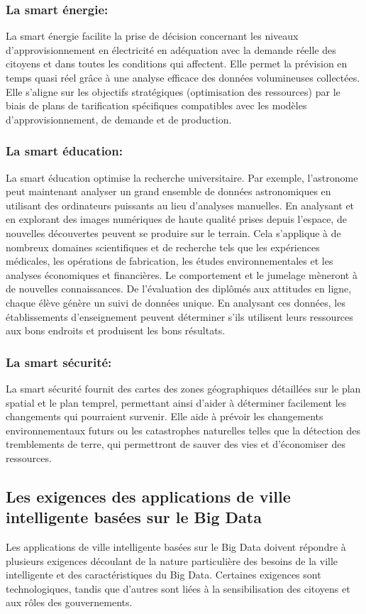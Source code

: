 \documentclass[french, a4paper, 12pt]{report}
\begin{document}
\subsubsection{La smart énergie:}
La smart énergie facilite la prise de décision concernant les niveaux d'approvisionnement en électricité en adéquation avec la demande réelle des citoyens et dans toutes les conditions qui affectent.
Elle permet la prévision en temps quasi réel grâce à une analyse efficace des données volumineuses collectées.
Elle s’aligne sur les objectifs stratégiques (optimisation des ressources) par le biais de plans de tarification spécifiques compatibles avec les modèles d'approvisionnement, de demande et de production.\\
\subsubsection{La smart éducation:}
La smart éducation optimise la recherche universitaire. Par exemple, l'astronome peut maintenant analyser un grand ensemble de données astronomiques en utilisant des ordinateurs puissants au lieu d'analyses manuelles. En analysant et en explorant des images numériques de haute qualité prises depuis l'espace, de nouvelles découvertes peuvent se produire sur le terrain. Cela s'applique à de nombreux domaines scientifiques et de recherche tels que les expériences médicales, les opérations de fabrication, les études environnementales et les analyses économiques et financières.
Le comportement et le jumelage mèneront à de nouvelles connaissances. De l'évaluation des diplômés aux attitudes en ligne, chaque élève génère un suivi de données unique. En analysant ces données, les établissements d’enseignement peuvent déterminer s’ils utilisent leurs ressources aux bons endroits et produisent les bons résultats.\\
\subsubsection{La smart sécurité:}
La smart sécurité fournit des cartes des zones géographiques détaillées sur le plan spatial et le plan temprel, permettant ainsi d’aider à déterminer facilement les changements qui pourraient survenir.
Elle aide à prévoir les changements environnementaux futurs ou les catastrophes naturelles telles que la détection des tremblements de terre, qui permettront de sauver des vies et d'économiser des ressources.\\

\subsection{Les exigences des applications de ville intelligente basées sur le Big Data}
Les applications de ville intelligente basées sur le Big Data doivent répondre à plusieurs exigences découlant de la nature particulière des besoins de la ville intelligente et des caractéristiques du Big Data. Certaines exigences sont technologiques, tandis que d’autres sont liées à la sensibilisation des citoyens et aux rôles des gouvernements.\\
\end{document}
